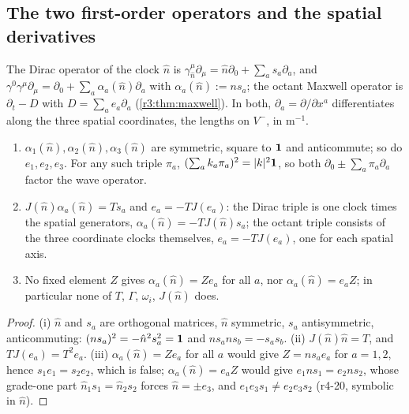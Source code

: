 \subsection{The two first-order operators and the spatial derivatives}
\label{r4:sec:operators}

The Dirac operator of the clock $\hat n$ is $\gamma^\mu_{\hat n}\partial_\mu=\hat n\partial_0+\sum_as_a\partial_a$, and $\gamma^0\gamma^\mu\partial_\mu=\partial_0+\sum_a\alpha_a(\hat n)\partial_a$ with
$\alpha_a(\hat n):=ns_a$; the octant Maxwell operator is $\partial_t-D$ with $D=\sum_ae_a\partial_a$ (\cref{r3:thm:maxwell}). In both, $\partial_a=\partial/\partial x^a$ differentiates
along the three spatial coordinates, the lengths on $V^-$, in $\mathrm m^{-1}$.

\begin{proposition}
\label{r4:prop:triples}
\begin{enumerate}[label=(\roman*),leftmargin=2.2em]
\item $\alpha_1(\hat n),\alpha_2(\hat n),\alpha_3(\hat n)$ are symmetric, square to $\mathbf 1$ and anticommute; so do $e_1,e_2,e_3$. For any such triple $\pi_a$,
$(\sum_ak_a\pi_a)^2=|k|^2\mathbf 1$, so both $\partial_0\pm\sum_a\pi_a\partial_a$ factor the wave operator.
\item $J(\hat n)\alpha_a(\hat n)=Ts_a$ and $e_a=-TJ(e_a)$: the Dirac triple is one clock times the spatial generators, $\alpha_a(\hat n)=-TJ(\hat n)s_a$; the octant triple consists of
the three coordinate clocks themselves, $e_a=-TJ(e_a)$, one for each spatial axis.
\item No fixed element $Z$ gives $\alpha_a(\hat n)=Ze_a$ for all $a$, nor $\alpha_a(\hat n)=e_aZ$; in particular none of $T$, $\Gamma$, $\omega_i$, $J(\hat n)$ does.
\end{enumerate}
\end{proposition}

\begin{proof}
(i) $\hat n$ and $s_a$ are orthogonal matrices, $\hat n$ symmetric, $s_a$ antisymmetric, anticommuting: $(ns_a)^2=-\hat n^2s_a^2=\mathbf 1$ and $ns_ans_b=-s_as_b$. (ii)
$J(\hat n)\hat n=T$, and $TJ(e_a)=T^2e_a$. (iii) $\alpha_a(\hat n)=Ze_a$ for all $a$ would give $Z=ns_ae_a$ for $a=1,2$, hence $s_1e_1=s_2e_2$, which is false;
$\alpha_a(\hat n)=e_aZ$ would give $e_1ns_1=e_2ns_2$, whose grade-one part $\hat n_1s_1=\hat n_2s_2$ forces $\hat n=\pm e_3$, and $e_1e_3s_1\neq e_2e_3s_2$ (r4-20, symbolic
in $\hat n$).
\end{proof}

